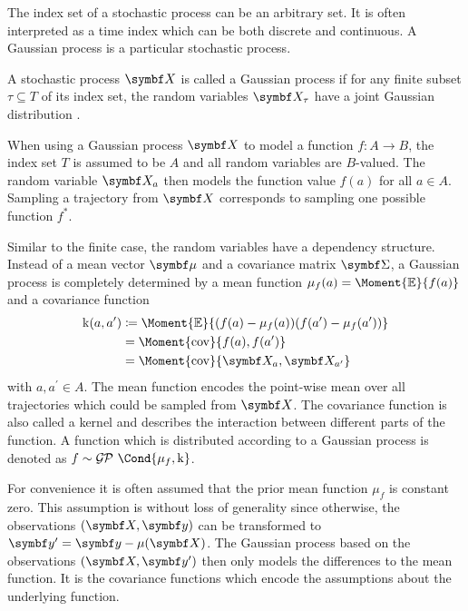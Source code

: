 The index set of a stochastic process can be an arbitrary set.
It is often interpreted as a time index which can be both discrete and continuous.
A Gaussian process is a particular stochastic process.
\begin{definition}
    \label{def:gp:gaussian_process}
    A stochastic process $\rv{X}$ is called a Gaussian process if for any finite subset $\tau \subseteq T$ of its index set, the random variables $\rv{X}_\tau$ have a joint Gaussian distribution \cite{astrom_introduction_1971}.
\end{definition}
When using a Gaussian process $\rv{X}$ to model a function $f \colon A \to B$, the index set $T$ is assumed to be $A$ and all random variables are $B$-valued.
The random variable $\rv{X_a}$ then models the function value $f(a)$ for all $a \in A$.
Sampling a trajectory from $\rv{X}$ corresponds to sampling one possible function $f^\ast$.

Similar to the finite case, the random variables have a dependency structure.
Instead of a mean vector $\mat{\mu}$ and a covariance matrix $\mat{\Sigma}$, a Gaussian process is completely determined by a mean function $\mu_f(a) = \Moment{\E}{f(a)}$ and a covariance function
\begin{align}
    \begin{split}
        \K(a, a^\prime) &\coloneqq \Moment{\E}{(f(a) - \mu_f(a))(f(a^\prime) - \mu_f(a^\prime))} \\
        &= \Moment{\cov}{f(a), f(a^\prime)} \\
        &= \Moment{\cov}{\rv{X_a}, \rv{X_{a^\prime}}}
    \end{split}
\end{align}
with $a, a^\prime \in A$.
The mean function encodes the point-wise mean over all trajectories which could be sampled from $\rv{X}$.
The covariance function is also called a kernel and describes the interaction between different parts of the function.
A function which is distributed according to a Gaussian process is denoted as $f \sim \GP\Cond{\mu_f, \K}$.

For convenience it is often assumed that the prior mean function $\mu_f$ is constant zero.
This assumption is without loss of generality \cite{rasmussen_gaussian_2006} since otherwise, the observations $\left( \mat{X}, \mat{y} \right)$ can be transformed to $\mat{y^\prime} = \mat{y} - \mu(\mat{X})$.
The Gaussian process based on the observations $\left( \mat{X}, \mat{y^\prime} \right)$ then only models the differences to the mean function.
It is the covariance functions which encode the assumptions about the underlying function.

